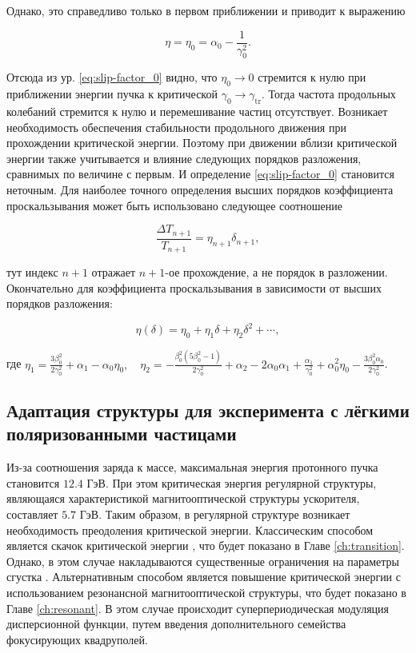 \noindent Однако, это справедливо только в первом приближении и приводит к выражению

\begin{equation}
	\eta = \eta_{0} = \alpha_{0} - \frac{1}{\gamma_{0}^2}.
	\label{eq:slip-factor_0}
\end{equation}

\noindent Отсюда из ур. \ref{eq:slip-factor_0} видно, что $\eta_{0}\rightarrow 0$ стремится к нулю при приближении энергии пучка к критической $\gamma_{0}\rightarrow\gamma_{\textrm{tr}}$. Тогда частота продольных колебаний стремится к нулю и перемешивание частиц отсутствует. Возникает необходимость обеспечения стабильности продольного движения при прохождении критической энергии. Поэтому при движении вблизи критической энергии также учитывается и влияние следующих порядков разложения, сравнимых по величине с первым. И определение \ref{eq:slip-factor_0} становится неточным. Для наиболее точного определения высших порядков коэффициента проскальзывания может быть использовано следующее соотношение \cite{ng}

\begin{equation}
	\frac{\Delta T_{n+1}}{T_{n+1}}=\eta_{n+1} \delta_{n+1},
\end{equation}

\noindent тут индекс $n+1$ отражает $n+1$-ое прохождение, а не порядок в разложении. Окончательно для коэффициента проскальзывания в зависимости от высших порядков разложения:

\begin{equation}
	\eta(\delta)=\eta_0+\eta_1 \delta+\eta_2 \delta^2+\cdots,
	\label{eq:eta}
\end{equation}

\noindent где $\eta_1=\frac{3\beta_0^2}{2\gamma_0^2}+\alpha_1-\alpha_0\eta_0,\quad\eta_2=-\frac{\beta_0^2\left(5 \beta_0^2-1\right)}{2 \gamma_0^2}+\alpha_2-2 \alpha_0 \alpha_1+\frac{\alpha_1}{\gamma_0^2}+\alpha_0^2 \eta_0-\frac{3 \beta_0^2 \alpha_0}{2 \gamma_0^2}$.

\subsection{Адаптация структуры для эксперимента с лёгкими поляризованными частицами}\label{sec:ch:ions_light/transition/energy}

\par Из-за соотношения заряда к массе, максимальная энергия протонного пучка становится $12.4$ ГэВ. При этом критическая энергия регулярной структуры, являющаяся характеристикой магнитооптической структуры ускорителя, составляет $5.7$ ГэВ. Таким образом, в регулярной структуре возникает необходимость преодоления критической энергии. Классическим способом является скачок критической энергии \cite{Kolokolchikov:2024_bb_rupac}, что будет показано в Главе \ref{ch:transition}. Однако, в этом случае накладываются существенные ограничения на параметры сгустка \cite{Kolokolchikov:2024_bb_dspin}. Альтернативным способом является повышение критической энергии с использованием резонансной магнитооптической структуры, что будет показано в Главе \ref{ch:resonant}. В этом случае происходит суперпериодическая модуляция дисперсионной функции, путем введения дополнительного семейства фокусирующих квадруполей.

